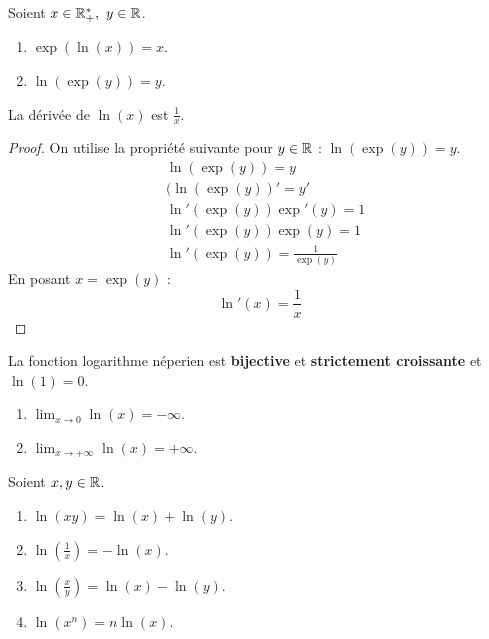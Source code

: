 \begin{proposition}
	Soient $x \in \mathbb{R}_+^*,\ y \in \mathbb{R}$.
    \begin{multicols}{2}
        \begin{enumerate}
            \item $\exp(\ln(x)) = x$.
            \item $\ln(\exp(y)) = y$.
        \end{enumerate}
    \end{multicols}
\end{proposition}

\begin{proposition}
	La dérivée de $\ln(x)$ est $\frac{1}{x}$.
\end{proposition}

\begin{proof}
	On utilise la propriété suivante pour $y \in \mathbb{R}$ : $\ln(\exp(y)) = y$.
	\begin{align*}
		&\ln(\exp(y)) = y \\
		&(\ln(\exp(y))' = y' \\
		&\ln'(\exp(y)) \exp'(y) = 1 \\
		&\ln'(\exp(y)) \exp(y) = 1 \\
		&\ln'(\exp(y)) = \frac{1}{\exp(y)}
	\end{align*}
	En posant $x = \exp(y)$ :
	\[ \ln'(x) = \frac{1}{x} \]
\end{proof}

\begin{proposition}
	La fonction logarithme néperien est \textbf{bijective} et \textbf{strictement croissante} et $\ln(1) = 0$.
    \begin{enumerate}
            \item $\lim_{x \to 0} \ln(x) = -\infty$.
            \item $\lim_{x \to +\infty} \ln(x) = +\infty$.
        \end{enumerate}
    \noindent Soient $x, y \in \mathbb{R}$.
    \begin{enumerate}
            \item $\ln(xy) = \ln(x) + \ln(y)$.
            \item $\ln(\frac{1}{x}) = -\ln(x)$.
            \item $\ln(\frac{x}{y}) = \ln(x) - \ln(y)$.
            \item $\ln(x^n) = n \ln(x)$.
        \end{enumerate}
\end{proposition}

